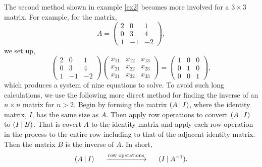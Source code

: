 \documentclass{ximera}
\begin{document}
The second method shown in example \ref{ex2} becomes more involved for a $3\times 3$ matrix. For example, for the matrix,
\[
A= \left(\begin{array}{ccc}
  2 &  0 & 1 \\
  0 &  3 & 4 \\
  1 & -1 & -2
\end{array}\right),
\]
 we set up,
 \[
\left(\begin{array}{ccc}
  2 &  0 & 1 \\
  0 &  3 & 4 \\
  1 & -1 & -2
\end{array}\right) \left(\begin{array}{ccc}
  x_{11} &  x_{12} & x_{13} \\
 x_{21} &  x_{22} & x_{23} \\
  x_{31} &  x_{32} & x_{33}
\end{array}\right)
= \left(\begin{array}{ccc}
  1 &  0 & 0 \\
  0 &  1 & 0 \\
  0 & 0 & 1
\end{array}\right),
\]
which produces a system of nine equations to solve. To avoid such long calculations, we use the following more direct method for finding the inverse of an $n\times n$ matrix for $n>2$. Begin by forming the matrix $(A \hspace{.08cm}|\hspace{.08cm} I)$, where the identity matrix, $I$, has the same size as $A$. Then apply row operations to convert $(A \hspace{.08cm}|\hspace{.08cm} I)$ to $(I \hspace{.08cm}|\hspace{.08cm} B)$. That is covert $A$ to the identity matrix and apply each row operation in the process to the entire row including to that of the adjacent identity matrix. Then the matrix $B$ is the inverse of $A$. In short,
\begin{equation}\label{method}
(A \hspace{.08cm}|\hspace{.08cm} I) \hspace{.5cm}\xrightarrow{\text{row operations}}\hspace{.5cm} (I \hspace{.08cm} |\hspace{.08cm} A^{-1}).
\end{equation}
\end{document}
